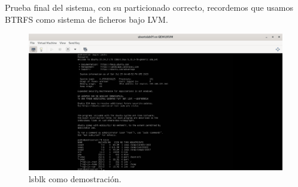 Prueba final del sistema, con su particionado correcto, recordemos que usamos BTRFS como sistema de ficheros bajo LVM.

\begin{figure}[H]
	\centering
	\includegraphics[scale=0.30]{17}
	\caption{lsblk como demostración.}
\end{figure}










%



%


